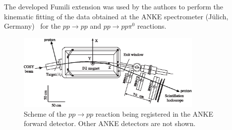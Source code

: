 
The developed Fumili extension was used by the authors to perform the kinematic fitting of the data obtained at the ANKE spectrometer (Jülich, Germany)~\cite{anke} for the $pp \to pp$ and $pp \to pp\pi^0$ reactions.

\begin{figure}[htbp]\centering
\includegraphics[width=0.8\textwidth]{pics/setup_bw.eps}
\caption{
Scheme of the $pp \to pp$ reaction being registered in the ANKE forward detector. Other ANKE detectors are not shown.
}
\label{anke_scheme}
\end{figure}


